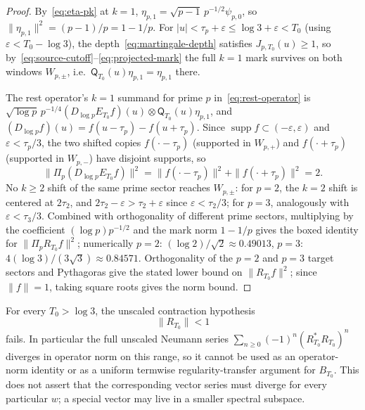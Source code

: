 \begin{proof}
By~\eqref{eq:eta-pk} at \(k=1\), \(\eta_{p,1}=\sqrt{p-1}\,p^{-1/2}\psi_{p,0}\), so
\(\|\eta_{p,1}\|^2=(p-1)/p=1-1/p\).  For \(|u|<\tau_p+\varepsilon\le\log3+\varepsilon<T_0\)
(using \(\varepsilon<T_0-\log3\)), the depth~\eqref{eq:martingale-depth} satisfies
\(J_{p,T_0}(u)\ge1\), so by~\eqref{eq:source-cutoff}--\eqref{eq:projected-mark} the full
\(k=1\) mark survives on both windows \(W_{p,\pm}\), i.e.\ \(\mathsf Q_{T_0}(u)\eta_{p,1}=\eta_{p,1}\)
there.

The rest operator's \(k=1\) summand for prime \(p\) in~\eqref{eq:rest-operator} is
\(\sqrt{\log p}\,p^{-1/4}(D_{\log p}E_{T_0}f)(u)\otimes\mathsf Q_{T_0}(u)\eta_{p,1}\), and
\((D_{\log p}f)(u)=f(u-\tau_p)-f(u+\tau_p)\).  Since
\(\operatorname{supp}f\subset(-\varepsilon,\varepsilon)\) and \(\varepsilon<\tau_p/3\), the
two shifted copies \(f(\cdot-\tau_p)\) (supported in \(W_{p,+}\)) and \(f(\cdot+\tau_p)\)
(supported in \(W_{p,-}\)) have disjoint supports, so
\[
 \|\Pi_p(D_{\log p}E_{T_0}f)\|^2=\|f(\cdot-\tau_p)\|^2+\|f(\cdot+\tau_p)\|^2=2.
\]
No \(k\ge2\) shift of the same prime sector reaches \(W_{p,\pm}\): for \(p=2\), the
\(k=2\) shift is centered at \(2\tau_2\), and \(2\tau_2-\varepsilon>\tau_2+\varepsilon\)
since \(\varepsilon<\tau_2/3\); for \(p=3\), analogously with \(\varepsilon<\tau_3/3\).
Combined with orthogonality of different prime sectors, multiplying by the coefficient
\((\log p)p^{-1/2}\) and the mark norm \(1-1/p\) gives the boxed identity for
\(\|\Pi_pR_{T_0}f\|^2\); numerically \(p=2\): \((\log2)/\sqrt2\approx0.49013\), \(p=3\):
\(4(\log3)/(3\sqrt3)\approx0.84571\).  Orthogonality of the \(p=2\) and \(p=3\) target
sectors and Pythagoras give the stated lower bound on \(\|R_{T_0}f\|^2\); since
\(\|f\|=1\), taking square roots gives the norm bound.
\end{proof}

\begin{corollary}
\label{cor:o3ag-nogo}
For every \(T_0>\log3\), the unscaled contraction hypothesis
\[
 \|R_{T_0}\|<1
\]
fails.  In particular the full unscaled Neumann series
\(\sum_{n\ge0}(-1)^n(R_{T_0}^*R_{T_0})^n\) diverges in operator norm on this range, so it
cannot be used as an operator-norm identity or as a uniform termwise regularity-transfer
argument for \(B_{T_0}\).  This does not assert that the corresponding vector series
must diverge for every particular \(w\); a special vector may live in a smaller spectral
subspace.
\end{corollary}

